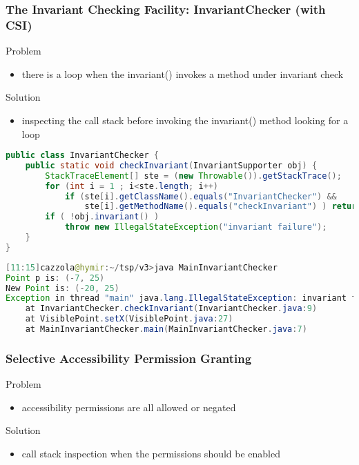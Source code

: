 \subsubsection{The Invariant Checking Facility: InvariantChecker (with CSI)}

Problem
\begin{itemize}
	\item there is a loop when the invariant() invokes a method under invariant check
\end{itemize}

Solution
\begin{itemize}
	\item inspecting the call stack before invoking the invariant() method looking for a loop
\end{itemize}

\begin{lstlisting}[language=Java]
public class InvariantChecker {
	public static void checkInvariant(InvariantSupporter obj) {
		StackTraceElement[] ste = (new Throwable()).getStackTrace();
		for (int i = 1 ; i<ste.length; i++)
			if (ste[i].getClassName().equals("InvariantChecker") &&
				ste[i].getMethodName().equals("checkInvariant") ) return ;
		if ( !obj.invariant() )
			throw new IllegalStateException("invariant failure");
	}
}
\end{lstlisting}

\begin{lstlisting}[language=Java]
[11:15]cazzola@hymir:~/tsp/v3>java MainInvariantChecker
Point p is: (-7, 25)
New Point is: (-20, 25)
Exception in thread "main" java.lang.IllegalStateException: invariant failure
	at InvariantChecker.checkInvariant(InvariantChecker.java:9)
	at VisiblePoint.setX(VisiblePoint.java:27)
	at MainInvariantChecker.main(MainInvariantChecker.java:7)
\end{lstlisting}

\subsubsection{Selective Accessibility Permission Granting}

Problem
\begin{itemize}
	\item accessibility permissions are all allowed or negated
\end{itemize}

Solution
\begin{itemize}
	\item call stack inspection when the permissions should be enabled
\end{itemize}

